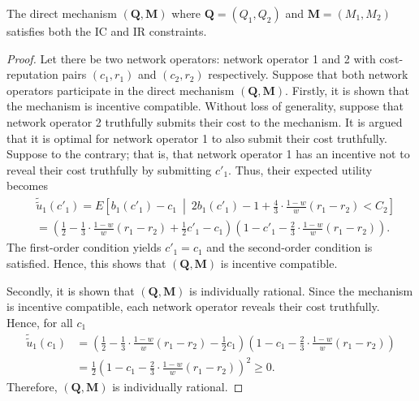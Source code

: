 \begin{propositiona}[\ref{prop:pcomp_direct_mechanism_direct}]
The direct mechanism $(\mathbf{Q},\mathbf{M})$ where $\mathbf{Q}=(Q_1,Q_2)$ and $\mathbf{M}=(M_1,M_2)$ satisfies both the IC and IR constraints.
\end{propositiona}
\begin{proof}
Let there be two network operators: network operator 1 and 2 with cost-reputation pairs $(c_1,r_1)$ and $(c_2,r_2)$ respectively. Suppose that both network operators participate in the direct mechanism $(\mathbf{Q},\mathbf{M})$. Firstly, it is shown that the mechanism is incentive compatible. Without loss of generality, suppose that network operator 2 truthfully submits their cost to the mechanism. It is argued that it is optimal for network operator 1 to also submit their cost truthfully. Suppose to the contrary; that is, that network operator 1 has an incentive not to reveal their cost truthfully by submitting $c'_1$. Thus, their expected utility becomes
\begin{align}
	&\tilde{\tilde{u}}_1(c'_1) = E\left[ b_1(c'_1) - c_1 \:\middle\vert\: 2b_1(c'_1) - 1 + \frac{4}{3}\cdot\frac{1-w}{w}(r_1-r_2) < C_2 \right] \\\nonumber
	&= \left(\frac{1}{2} - \frac{1}{3}\cdot\frac{1-w}{w}(r_1-r_2) + \frac{1}{2}c'_1 - c_1 \right)\left(1 - c'_1 - \frac{2}{3}\cdot\frac{1-w}{w}(r_1-r_2)\right).
\end{align}
The first-order condition yields $c'_1 = c_1$ and the second-order condition is satisfied. Hence, this shows that $(\mathbf{Q},\mathbf{M})$ is incentive compatible.

Secondly, it is shown that $(\mathbf{Q},\mathbf{M})$ is individually rational. Since the mechanism is incentive compatible, each network operator reveals their cost truthfully. Hence, for all $c_1$
\begin{align}
	\tilde{\tilde{u}}_1(c_1) &= \left(\frac{1}{2} - \frac{1}{3}\cdot\frac{1-w}{w}(r_1-r_2) - \frac{1}{2}c_1 \right)\left(1 - c_1 - \frac{2}{3}\cdot\frac{1-w}{w}(r_1-r_2)\right)\\\nonumber
	&= \frac{1}{2}\left( 1 - c_1 - \frac{2}{3}\cdot\frac{1-w}{w}(r_1-r_2) \right)^2 \ge 0.
\end{align}
Therefore, $(\mathbf{Q},\mathbf{M})$ is individually rational.
\end{proof}

